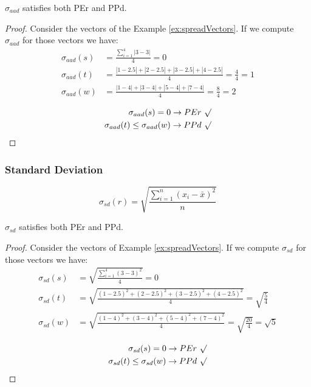 \documentclass[version=3.21, pagesize, notitlepage, twoside=off, bibliography=totoc, DIV=calc, fontsize=12pt, a4paper]{scrartcl}
\begin{document}
\begin{proposition}
	$\sigma_{aad}$ satisfies both PEr and PPd.
\end{proposition}
\begin{proof}
	Consider the vectors of the Example \ref{ex:spreadVectors}.
	If we compute $\sigma_{aad}$ for those vectors we have:
	\begin{align}
	\sigma_{aad}(s) &= \frac{\sum_{i=1}^{4} |3-3|}{4} =0 \\
	\sigma_{aad}(t) &= \frac{|1-2.5|+|2-2.5|+|3-2.5|+|4-2.5|}{4}=\frac{4}{4}=1 \\
	\sigma_{aad}(w) &= \frac{|1-4|+|3-4|+|5-4|+|7-4|}{4}=\frac{8}{4}=2 \\
	\end{align}
	\begin{align}
	\sigma_{aad}(s) = 0 \rightarrow PEr \ \surd \\
	\sigma_{aad}(t) \leq \sigma_{aad}(w) \rightarrow PPd \ \surd \\
	\end{align}
\end{proof}

\subsubsection{Standard Deviation}
\[\sigma_{sd}(r)= \sqrt{\frac{\sum_{i=1}^{n}(x_i-\bar{x})^2}{n}}\]
\begin{proposition}
	$\sigma_{sd}$ satisfies both PEr and PPd.
\end{proposition}
\begin{proof}
	Consider the vectors of Example \ref{ex:spreadVectors}.
	If we compute $\sigma_{sd}$ for those vectors we have:
	\begin{align}
	\sigma_{sd}(s) &= \sqrt{\frac{\sum_{i=1}^{4} (3-3)^2}{4}}=0 \\
	\sigma_{sd}(t) &= \sqrt{\frac{(1-2.5)^2+(2-2.5)^2+(3-2.5)^2+(4-2.5)^2}{4}}=\sqrt{\frac{5}{4}} \\
	\sigma_{sd}(w) &= \sqrt{\frac{(1-4)^2+(3-4)^2+(5-4)^2+(7-4)^2}{4}}=\sqrt{\frac{20}{4}}=\sqrt{5} \\
	\end{align}
	\begin{align}
	\sigma_{sd}(s) = 0 \rightarrow PEr \ \surd \\
	\sigma_{sd}(t) \leq \sigma_{sd}(w) \rightarrow PPd \ \surd \\
	\end{align}
\end{proof}
\end{document}
